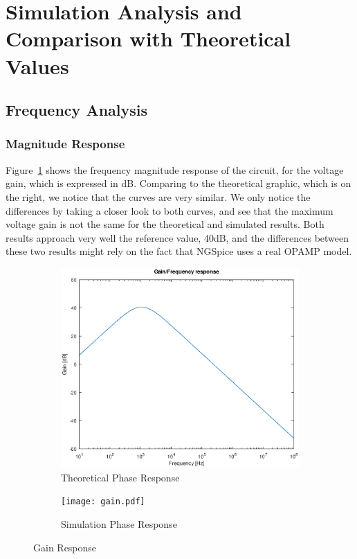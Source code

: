 \section{Simulation Analysis and Comparison with Theoretical Values}
\label{sec:simulation}

\subsection{Frequency Analysis}
\subsubsection{Magnitude Response}

Figure~\ref{fig:gain} shows the frequency magnitude response of the circuit, for the voltage gain, which is expressed in dB. Comparing to the theoretical graphic, which is on the right, we notice that the curves are very similar. We only notice the differences by taking a closer look to both curves, and see that the maximum voltage gain is not the same for the theoretical and simulated results. Both results approach very well the reference value, 40dB, and the differences between these two results might rely on the fact that NGSpice uses a real OPAMP model.

\begin{figure}[H]
\centering
\begin{subfigure}{.5\textwidth}
    \centering
    \vspace{2.8 cm}
    \includegraphics[scale=0.4]{gain_response.eps}
    \caption{Theoretical Phase Response}
\end{subfigure}%
\begin{subfigure}{.5\textwidth}
    \centering
    \texttt{[image: gain.pdf]}
    \caption{Simulation Phase Response}
\end{subfigure}
\caption{Gain Response}
\label{fig:gain}
\end{figure}



